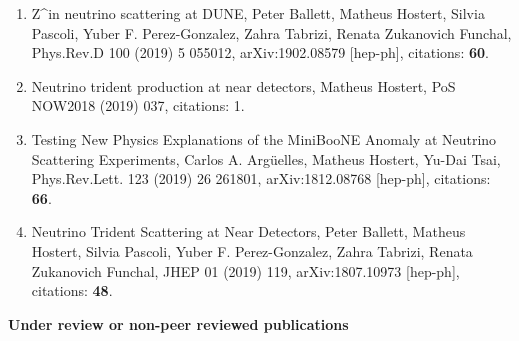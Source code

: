 \documentclass[a4paper,10pt]{article}
\begin{document}
\begin{enumerate}
\item Z^\primes in neutrino scattering at DUNE, Peter Ballett, Matheus Hostert, Silvia Pascoli, Yuber F. Perez-Gonzalez, Zahra Tabrizi, Renata Zukanovich Funchal, Phys.Rev.D 100 (2019) 5 055012, arXiv:1902.08579 [hep-ph], citations: \textbf{60}.
\item Neutrino trident production at near detectors, Matheus Hostert, PoS NOW2018 (2019) 037, citations: 1.
\item Testing New Physics Explanations of the MiniBooNE Anomaly at Neutrino Scattering Experiments, Carlos A. Argüelles, Matheus Hostert, Yu-Dai Tsai, Phys.Rev.Lett. 123 (2019) 26 261801, arXiv:1812.08768 [hep-ph], citations: \textbf{66}.
\item Neutrino Trident Scattering at Near Detectors, Peter Ballett, Matheus Hostert, Silvia Pascoli, Yuber F. Perez-Gonzalez, Zahra Tabrizi, Renata Zukanovich Funchal, JHEP 01 (2019) 119, arXiv:1807.10973 [hep-ph], citations: \textbf{48}.
\end{enumerate}
\textbf{Under review or non-peer reviewed publications}
\end{document}
